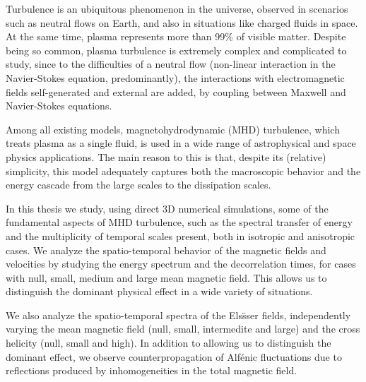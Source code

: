 Turbulence is an ubiquitous phenomenon in the universe, observed in
scenarios such as neutral flows on Earth, and also in situations like
charged fluids in space. At the same time, plasma represents more than
99\% of visible matter. Despite being so common, plasma turbulence is
extremely complex and complicated to study, since to the difficulties
of a neutral flow (non-linear interaction in the Navier-Stokes
equation, predominantly), the interactions with electromagnetic fields
self-generated and external are added, by coupling between Maxwell and
Navier-Stokes equations.

Among all existing models, magnetohydrodynamic (MHD) turbulence, which
treats plasma as a single fluid, is used in a wide range
of astrophysical and space physics applications. The main reason to
this is that, despite its (relative) simplicity, this model adequately
captures both the macroscopic behavior and the energy cascade from the
large scales to the dissipation scales.

In this thesis we study, using direct 3D numerical simulations, some
of the fundamental aspects of MHD turbulence, such as the spectral
transfer of energy and the multiplicity of temporal scales present,
both in isotropic and anisotropic cases. We analyze the
spatio-temporal behavior of the magnetic fields and velocities by
studying the energy spectrum and the decorrelation times, for cases
with null, small, medium and large mean magnetic field. This allows us
to distinguish the dominant physical effect in a wide variety of
situations.

We also analyze the spatio-temporal spectra of the Els\"sser fields,
independently varying the mean magnetic field (null, small,
intermedite and large) and the cross helicity (null, small and
high). In addition to allowing us to distinguish the dominant effect,
we observe counterpropagation of Alf\'enic fluctuations due to
reflections produced by inhomogeneities in the total magnetic field.
